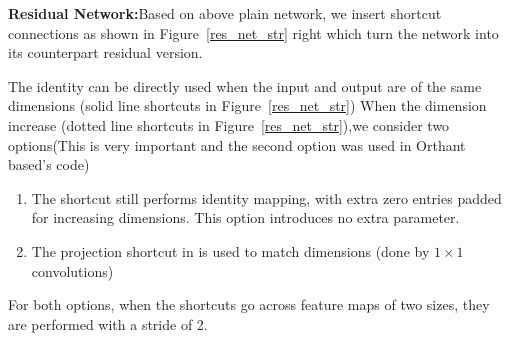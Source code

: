 \documentclass[11pt,en,bibstyle=ieeetr]{elegantpaper}
\begin{document}
\textbf{Residual Network:}Based on above plain network, we insert shortcut connections as shown in Figure~\ref{res_net_str} right which turn the network into its counterpart residual version.

The identity can be directly used when the input and output are of the same dimensions (solid line shortcuts in Figure~\ref{res_net_str})
When the dimension increase (dotted line shortcuts in Figure~\ref{res_net_str}),we consider two options(This is very important and the second option was used in Orthant based's code)
\begin{enumerate}
	\item The shortcut still performs identity mapping, with extra zero entries padded for increasing dimensions. This option introduces no extra parameter.
	\item The projection shortcut in is used to match dimensions (done by $ 1\times 1$ convolutions)
\end{enumerate}
For both options, when the shortcuts go across feature maps of two sizes, they are performed with a stride of 2.
\end{document}
